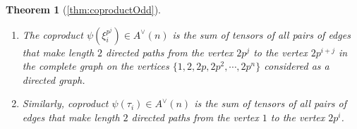 \documentclass{amsart}
\newtheorem*{thm*}{Theorem}
\theoremstyle{definition}
\theoremstyle{plain}
\numberwithin{theorem}{section}
\numberwithin{equation}{section}
\numberwithin{figure}{section}
\newcommand{\0}{\langle 0 \rangle }
\begin{document}
\begin{thm*}[\cref{thm:coproductOdd}]
\hfill

\begin{enumerate}
    \item[I.] %
    The coproduct $\psi(\xi_i^{p^j}) \in A^\vee(n)$ is the sum of tensors of all pairs of edges that make length $2$ directed paths from the vertex $2 p^j$ to the vertex $2 p^{i +j}$ in the complete graph on the vertices $\{1, 2, 2p, 2p^2, \cdots, 2p^n \}$ considered as a directed graph.
     
    \item[II.] Similarly, coproduct $\psi(\tau_i) \in A^\vee(n)$ is the sum of tensors of all pairs of edges that make length $2$ directed paths from the vertex $1$ to the vertex $2 p^i$.
     \end{enumerate}
\color{black}

\end{thm*}
\end{document}
